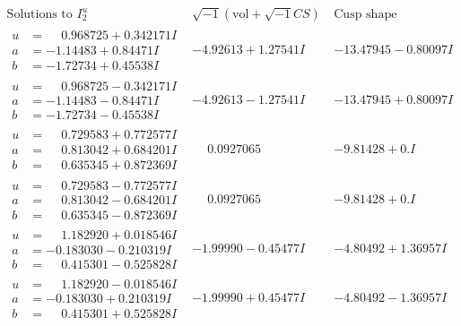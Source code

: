 \documentclass[1p]{elsarticle_modified}
\theoremstyle{definition}
\newcommand{\I}{\sqrt{-1}}
\begin{document}
$$\begin{array}{c|c|c}  
\text{Solutions to }I^u_{2}& \I (\text{vol} + \sqrt{-1}CS) & \text{Cusp shape}\\
 \hline 
\begin{aligned}
u &= \phantom{-}0.968725 + 0.342171 I \\
a &= -1.14483 + 0.84471 I \\
b &= -1.72734 + 0.45538 I\end{aligned}
 & -4.92613 + 1.27541 I & -13.47945 - 0.80097 I \\ \hline\begin{aligned}
u &= \phantom{-}0.968725 - 0.342171 I \\
a &= -1.14483 - 0.84471 I \\
b &= -1.72734 - 0.45538 I\end{aligned}
 & -4.92613 - 1.27541 I & -13.47945 + 0.80097 I \\ \hline\begin{aligned}
u &= \phantom{-}0.729583 + 0.772577 I \\
a &= \phantom{-}0.813042 + 0.684201 I \\
b &= \phantom{-}0.635345 + 0.872369 I\end{aligned}
 & \phantom{-}0.0927065\phantom{ +0.000000I} & -9.81428 + 0. I\phantom{ +0.000000I} \\ \hline\begin{aligned}
u &= \phantom{-}0.729583 - 0.772577 I \\
a &= \phantom{-}0.813042 - 0.684201 I \\
b &= \phantom{-}0.635345 - 0.872369 I\end{aligned}
 & \phantom{-}0.0927065\phantom{ +0.000000I} & -9.81428 + 0. I\phantom{ +0.000000I} \\ \hline\begin{aligned}
u &= \phantom{-}1.182920 + 0.018546 I \\
a &= -0.183030 - 0.210319 I \\
b &= \phantom{-}0.415301 - 0.525828 I\end{aligned}
 & -1.99990 - 0.45477 I & -4.80492 + 1.36957 I \\ \hline\begin{aligned}
u &= \phantom{-}1.182920 - 0.018546 I \\
a &= -0.183030 + 0.210319 I \\
b &= \phantom{-}0.415301 + 0.525828 I\end{aligned}
 & -1.99990 + 0.45477 I & -4.80492 - 1.36957 I \\ \hline\begin{aligned}

\end{aligned}
\end{array}$$
\end{document}
